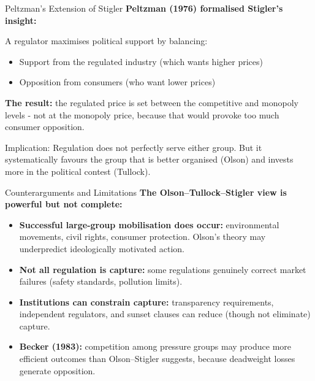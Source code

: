 \documentclass[10pt]{beamer}
\begin{document}
\begin{frame}{Peltzman's Extension of Stigler}
\textbf{Peltzman (1976) formalised Stigler's insight:}

\vspace{0.1cm}
A regulator maximises political support by balancing:
\begin{itemize}
\item Support from the regulated industry (which wants higher prices)
\item Opposition from consumers (who want lower prices)
\end{itemize}

\vspace{0.1cm}
\textbf{The result:} the regulated price is set between the competitive and monopoly levels - not at the monopoly price, because that would provoke too much consumer opposition.

\vspace{0.1cm}
\alert{Implication:}
Regulation does not perfectly serve either group.
But it systematically favours the group that is better organised (Olson) and invests more in the political contest (Tullock).
\end{frame}


\begin{frame}{Counterarguments and Limitations}
\textbf{The Olson--Tullock--Stigler view is powerful but not complete:}

\vspace{0.1cm}
\begin{itemize}
\item \textbf{Successful large-group mobilisation does occur:}
environmental movements, civil rights, consumer protection.
Olson's theory may underpredict ideologically motivated action.

\vspace{0.1cm}
\item \textbf{Not all regulation is capture:}
some regulations genuinely correct market failures (safety standards, pollution limits).

\vspace{0.1cm}
\item \textbf{Institutions can constrain capture:}
transparency requirements, independent regulators, and sunset clauses can reduce (though not eliminate) capture.

\vspace{0.1cm}
\item \textbf{Becker (1983):}
competition among pressure groups may produce more efficient outcomes than Olson--Stigler suggests, because deadweight losses generate opposition.
\end{itemize}
\end{frame}
\end{document}
